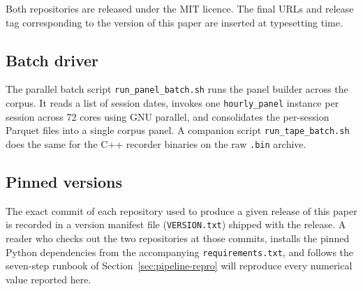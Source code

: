 \documentclass[11pt]{article}
\begin{document}
Both repositories are released under the MIT licence. The final URLs and release tag corresponding to the version of this paper are inserted at typesetting time.

\subsection*{Batch driver}

The parallel batch script \texttt{run\_panel\_batch.sh} runs the panel builder across the corpus. It reads a list of session dates, invokes one \texttt{hourly\_panel} instance per session across 72 cores using GNU parallel, and consolidates the per-session Parquet files into a single corpus panel. A companion script \texttt{run\_tape\_batch.sh} does the same for the C++ recorder binaries on the raw \texttt{.bin} archive.

\subsection*{Pinned versions}

The exact commit of each repository used to produce a given release of this paper is recorded in a version manifest file (\texttt{VERSION.txt}) shipped with the release. A reader who checks out the two repositories at those commits, installs the pinned Python dependencies from the accompanying \texttt{requirements.txt}, and follows the seven-step runbook of Section~\ref{sec:pipeline-repro} will reproduce every numerical value reported here.

\nocite{bacrydelattre2013,filimonovsornette2012,rambaldibacrymuzy2018}
\end{document}
